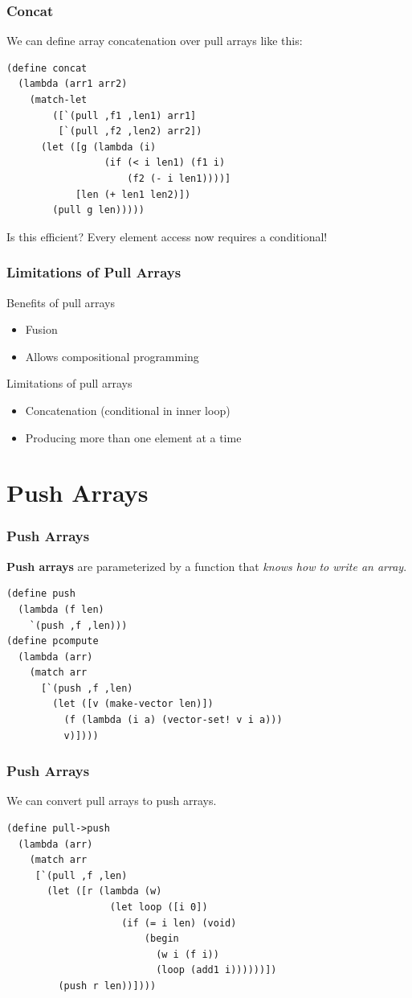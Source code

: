 \documentclass[12pt,letterpaper]{beamer}
\begin{document}
\begin{frame}[fragile]
  \frametitle{Concat}
  We can define array concatenation over pull arrays like this:
  \begin{lstlisting}
(define concat
  (lambda (arr1 arr2)
    (match-let
        ([`(pull ,f1 ,len1) arr1]
         [`(pull ,f2 ,len2) arr2])
      (let ([g (lambda (i)
                 (if (< i len1) (f1 i)
                     (f2 (- i len1))))]
            [len (+ len1 len2)])
        (pull g len)))))
  \end{lstlisting}
  Is this efficient?
  Every element access now requires a conditional!
\end{frame}

\begin{frame}
  \frametitle{Limitations of Pull Arrays}
  \begin{block}{Benefits of pull arrays}
  \begin{itemize}
  \item Fusion
  \item Allows compositional programming
  \end{itemize}
  \end{block}
  \begin{block}{Limitations of pull arrays}
  \begin{itemize}
  \item Concatenation (conditional in inner loop)
  \item Producing more than one element at a time
  \end{itemize}
  \end{block}
\end{frame}

\section{Push Arrays}
  
\begin{frame}[fragile]
  \frametitle{Push Arrays}
  \textbf{Push arrays} are parameterized by a function that {\em knows how to write an array}.
  \begin{lstlisting}
(define push
  (lambda (f len)
    `(push ,f ,len)))    
(define pcompute
  (lambda (arr)
    (match arr
      [`(push ,f ,len)
        (let ([v (make-vector len)])
          (f (lambda (i a) (vector-set! v i a)))
          v)])))
  \end{lstlisting}
\end{frame}

\begin{frame}[fragile]
  \frametitle{Push Arrays}
  We can convert pull arrays to push arrays.
  \begin{lstlisting}
(define pull->push
  (lambda (arr)
    (match arr
     [`(pull ,f ,len)
       (let ([r (lambda (w)
                  (let loop ([i 0])
                    (if (= i len) (void)
                        (begin
                          (w i (f i))
                          (loop (add1 i))))))])
         (push r len))])))
  \end{lstlisting}
\end{frame}
\end{document}
